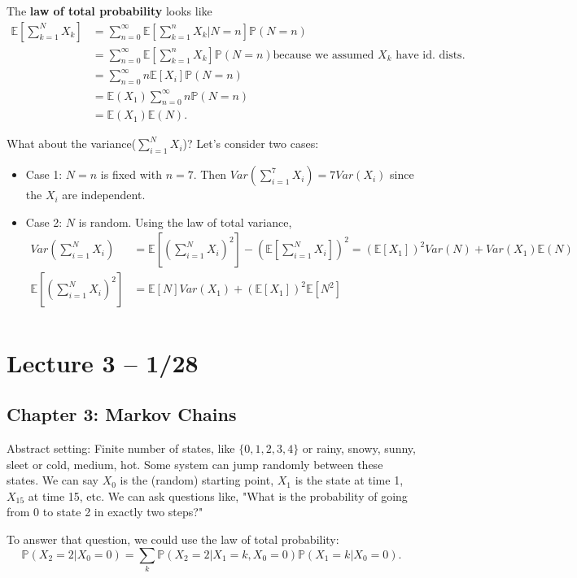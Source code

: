 \documentclass{article}
\newcommand{\PP}{\mathbb{P}}
\newcommand{\E}{\mathbb{E}}
\begin{document}
\begin{definition}
  The \textbf{law of total probability} looks like
  \begin{align*}
    \E\left[\sum_{k=1}^{N}X_k\right] &= \sum_{n=0}^{\infty}\E[\sum_{k=1}^{n}X_k | N=n]\PP(N=n) \\
    &= \sum_{n=0}^{\infty} \E[\sum_{k=1}^{n}X_k] \PP(N=n) \text{because we assumed }X_k\text{ have id. dists.}\\
    &= \sum_{n=0}^{\infty} n \E[X_i] \PP(N=n) \\
    &= \E(X_1) \sum_{n=0}^{\infty} n \PP(N=n) \\
    &= \E(X_1) \E(N).
  \end{align*}
\end{definition}

What about the variance($\sum_{i=1}^{N}X_i$)?
Let's consider two cases:
\begin{itemize}
  \item Case 1: $N=n$ is fixed with $n=7$. Then $Var(\sum_{i=1}^{7}X_i)=7 Var(X_i)$ since the $X_i$ are independent.
  \item Case 2: $N$ is random. Using the law of total variance,
    \begin{align*}
      Var(\sum_{i=1}^{N}X_i) &= \E[(\sum_{i=1}^{N}X_i)^2] - (\E[\sum_{i=1}^{N}X_i])^2 = (\E[X_1])^2Var(N)+Var(X_1)\E(N) \\
      \E[(\sum_{i=1}^{N}X_i)^2] &= \E[N]Var(X_1) + (\E[X_1])^2 \E[N^2] \\
    \end{align*}
\end{itemize}

\section{Lecture 3 -- 1/28}
\subsection{Chapter 3: Markov Chains}
Abstract setting: Finite number of states, like $\{0, 1, 2, 3, 4\}$ or {rainy, snowy, sunny, sleet} or {cold, medium, hot}. Some system can jump randomly between these states. We can say $X_0$ is the (random) starting point, $X_1$ is the state at time 1, $X_15$ at time 15, etc. We can ask questions like, "What is the probability of going from 0 to state 2 in exactly two steps?"

To answer that question, we could use the law of total probability:
\[\PP(X_2=2|X_0=0)=\sum_{k}\PP(X_2=2|X_1=k, X_0=0)\PP(X_1=k|X_0=0).\]
\end{document}
